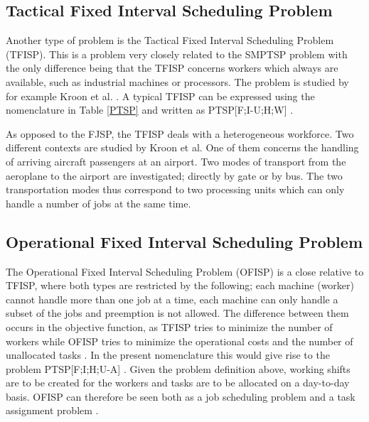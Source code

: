 \subsection{Tactical Fixed Interval Scheduling Problem}
Another type of problem is the Tactical Fixed Interval Scheduling Problem (TFISP). This is a problem very closely related to the SMPTSP problem with the only difference being that the TFISP concerns workers which always are available, such as industrial machines or processors. The problem is studied by for example Kroon et al. \citet{kroon_1997}. A typical TFISP can be expressed using the nomenclature in Table \ref{PTSP} and written as PTSP[F;I-U;H;W] \citet{krishnamoorthy_2001}.

As opposed to the FJSP, the TFISP deals with a heterogeneous workforce. Two different contexts are studied by Kroon et al. One of them concerns the handling of arriving aircraft passengers at an airport. Two modes of transport from the aeroplane to the airport are investigated; directly by gate or by bus. The two transportation modes thus correspond to two processing units which can only handle a number of jobs at the same time.

\subsection{Operational Fixed Interval Scheduling Problem}
The Operational Fixed Interval Scheduling Problem (OFISP) is a close relative to TFISP, where both types are restricted by the following; each machine (worker) cannot handle more than one job at a time, each machine can only handle a subset of the jobs and preemption is not allowed. The difference between them occurs in the objective function, as TFISP tries to minimize the number of workers while OFISP tries to minimize the operational costs and the number of unallocated tasks \citet{kroon_1993}. In the present nomenclature this would give rise to the problem PTSP[F;I;H;U-A] \citet{krishnamoorthy_2001}. Given the problem definition above, working shifts are to be created for the workers and tasks are to be allocated on a day-to-day basis. OFISP can therefore be seen both as a job scheduling problem and a task assignment problem \citet{kroon_1993}.



%


